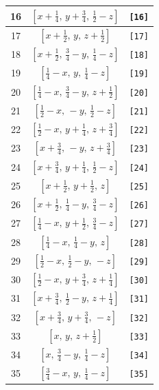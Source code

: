 \documentclass[fleqn,8pt]{jsarticle}
\begin{document}
\begin{longtable}{ccc}
16 & $\left[ x + \frac{1}{4},\, y + \frac{3}{4},\, \frac{1}{2} - z \right]$ & {\tt [16]} \\ \hline
17 & $\left[ x + \frac{1}{2},\, y,\, z + \frac{1}{2} \right]$ & {\tt [17]} \\ \hline
18 & $\left[ x + \frac{1}{2},\, \frac{3}{4} - y,\, \frac{1}{4} - z \right]$ & {\tt [18]} \\ \hline
19 & $\left[ \frac{1}{4} - x,\, y,\, \frac{1}{4} - z \right]$ & {\tt [19]} \\ \hline
20 & $\left[ \frac{1}{4} - x,\, \frac{3}{4} - y,\, z + \frac{1}{2} \right]$ & {\tt [20]} \\ \hline
21 & $\left[ \frac{1}{2} - x,\, - y,\, \frac{1}{2} - z \right]$ & {\tt [21]} \\ \hline
22 & $\left[ \frac{1}{2} - x,\, y + \frac{1}{4},\, z + \frac{3}{4} \right]$ & {\tt [22]} \\ \hline
23 & $\left[ x + \frac{3}{4},\, - y,\, z + \frac{3}{4} \right]$ & {\tt [23]} \\ \hline
24 & $\left[ x + \frac{3}{4},\, y + \frac{1}{4},\, \frac{1}{2} - z \right]$ & {\tt [24]} \\ \hline
25 & $\left[ x + \frac{1}{2},\, y + \frac{1}{2},\, z \right]$ & {\tt [25]} \\ \hline
26 & $\left[ x + \frac{1}{2},\, \frac{1}{4} - y,\, \frac{3}{4} - z \right]$ & {\tt [26]} \\ \hline
27 & $\left[ \frac{1}{4} - x,\, y + \frac{1}{2},\, \frac{3}{4} - z \right]$ & {\tt [27]} \\ \hline
28 & $\left[ \frac{1}{4} - x,\, \frac{1}{4} - y,\, z \right]$ & {\tt [28]} \\ \hline
29 & $\left[ \frac{1}{2} - x,\, \frac{1}{2} - y,\, - z \right]$ & {\tt [29]} \\ \hline
30 & $\left[ \frac{1}{2} - x,\, y + \frac{3}{4},\, z + \frac{1}{4} \right]$ & {\tt [30]} \\ \hline
31 & $\left[ x + \frac{3}{4},\, \frac{1}{2} - y,\, z + \frac{1}{4} \right]$ & {\tt [31]} \\ \hline
32 & $\left[ x + \frac{3}{4},\, y + \frac{3}{4},\, - z \right]$ & {\tt [32]} \\ \hline
33 & $\left[ x,\, y,\, z + \frac{1}{2} \right]$ & {\tt [33]} \\ \hline
34 & $\left[ x,\, \frac{3}{4} - y,\, \frac{1}{4} - z \right]$ & {\tt [34]} \\ \hline
35 & $\left[ \frac{3}{4} - x,\, y,\, \frac{1}{4} - z \right]$ & {\tt [35]} \\ \hline

\end{longtable}
\end{document}
